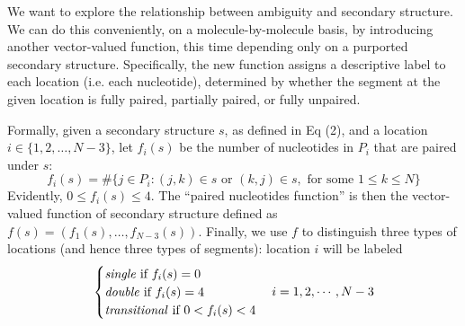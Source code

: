 \documentclass[10pt,letterpaper]{article}
\begin{document}
We want to explore the relationship between ambiguity and secondary structure. 
We can do this conveniently, on a molecule-by-molecule basis, by introducing another vector-valued function, this time depending only on a purported secondary structure.  Specifically, the new function assigns a descriptive label to each location (i.e. each nucleotide), determined by whether the segment at the given location is fully paired, partially paired, or fully unpaired. 

Formally, given a secondary structure $s$, as defined in Eq (2), and a location $i\in\{1, 2,\ldots,N-3\}$, let $f_i(s)$ be the number of nucleotides in $P_i$ that are paired under $s$:
\begin{equation}
f_i(s) = \#\{j\in P_i:(j,k)\in s\text{ or } (k,j)\in s, \text{ for some } 1\leq k \leq N\}
\end{equation}
Evidently, $0\leq f_i(s)\leq 4$. The ``paired nucleotides function'' is then the 
vector-valued function of secondary structure defined as 
$f(s)=(f_1(s),\ldots,f_{N-3}(s))$.
Finally, we use $f$ to distinguish three types of locations (and hence three types of segments): location $i$ will be labeled 
\begin{equation}
	\begin{cases}
		\text{\textit{single} if } f_i(s) = 0 \\
		\text{\textit{double} if } f_i(s) = 4 \\
		\text{\textit{transitional} if } 0 < f_i(s) < 4
	\end{cases} i = 1, 2, \cdots, N - 3
\end{equation}
\end{document}
